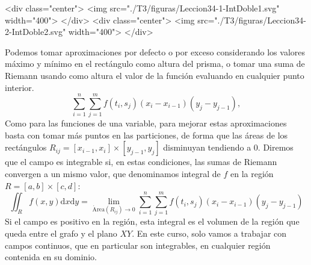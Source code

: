 \begin{rawhtml}
<div class="center">
<img src="./T3/figuras/Leccion34-1-IntDoble1.svg" width="400">
</div>
<div class="center">
<img src="./T3/figuras/Leccion34-2-IntDoble2.svg" width="400">
</div>
\end{rawhtml}

Podemos tomar aproximaciones por defecto o por exceso considerando los valores máximo y mínimo en el rectángulo como altura del prisma, o tomar una suma de Riemann usando como altura el valor de la función evaluando en cualquier punto interior.
\[
\sum_{i=1}^n\sum_{j=1}^m f(t_i,s_j)(x_i-x_{i-1})(y_j-y_{j-1}),
\]
Como para las funciones de una variable, para mejorar estas aproximaciones basta con tomar más puntos en las particiones, de forma que las áreas de los rectángulos
$R_{ij}=[x_{i-1},x_i]\times[y_{j-1},y_j]$ disminuyan tendiendo a 0.
Diremos que el campo es integrable si, en estas condiciones, las sumas de Riemann convergen a un mismo valor, que denominamos integral de $f$ en la región $R=[a,b]\times[c,d]$:
\[
\iint_Rf(x,y)\mathrm dx\mathrm dy = \lim_{\mathrm{\acute{A}rea}(R_{ij})\to 0} \sum_{i=1}^n\sum_{j=1}^m f(t_i,s_j)(x_i-x_{i-1})(y_j-y_{j-1})
\]
Si el campo es positivo en la región, esta integral es el volumen de la región que queda entre el grafo y el plano $XY$.
En este curso, solo vamos a trabajar con campos continuos, que en particular son integrables, en cualquier región contenida en su dominio.
%


